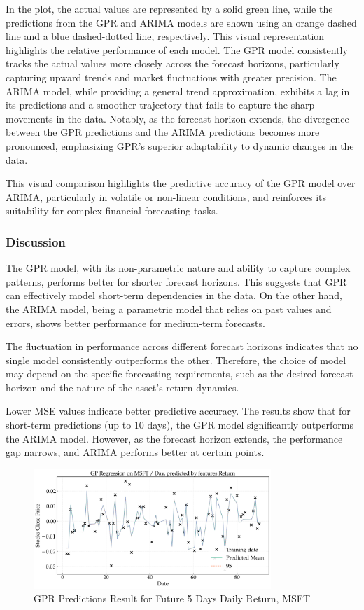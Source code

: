 \noindent In the plot, the actual values are represented by a solid green line, while the predictions from the GPR and ARIMA models are shown using an orange dashed line and a blue dashed-dotted line, respectively. This visual representation highlights the relative performance of each model.
The \ac{GPR} model consistently tracks the actual values more closely across the forecast horizons, particularly capturing upward trends and market fluctuations with greater precision. The ARIMA model, while providing a general trend approximation, exhibits a lag in its predictions and a smoother trajectory that fails to capture the sharp movements in the data. Notably, as the forecast horizon extends, the divergence between the GPR predictions and the ARIMA predictions becomes more pronounced, emphasizing GPR’s superior adaptability to dynamic changes in the data.

This visual comparison highlights the predictive accuracy of the GPR model over ARIMA, particularly in volatile or non-linear conditions, and reinforces its suitability for complex financial forecasting tasks.
\subsubsection{Discussion}

The GPR model, with its non-parametric nature and ability to capture complex patterns, performs better for shorter forecast horizons. This suggests that GPR can effectively model short-term dependencies in the data. On the other hand, the ARIMA model, being a parametric model that relies on past values and errors, shows better performance for medium-term forecasts.

The fluctuation in performance across different forecast horizons indicates that no single model consistently outperforms the other. Therefore, the choice of model may depend on the specific forecasting requirements, such as the desired forecast horizon and the nature of the asset's return dynamics.

Lower MSE values indicate better predictive accuracy. The results show that for short-term predictions (up to 10 days), the GPR model significantly outperforms the ARIMA model. However, as the forecast horizon extends, the performance gap narrows, and ARIMA performs better at certain points.

\begin{figure}[htbp]
\centering
\includegraphics[width=0.8\textwidth]{figures/future_predictions_MSFT_return.png}
\caption{GPR Predictions Result for Future 5 Days Daily Return, MSFT}
\label{fig:future_predictions_MSFT_return}
\end{figure}


